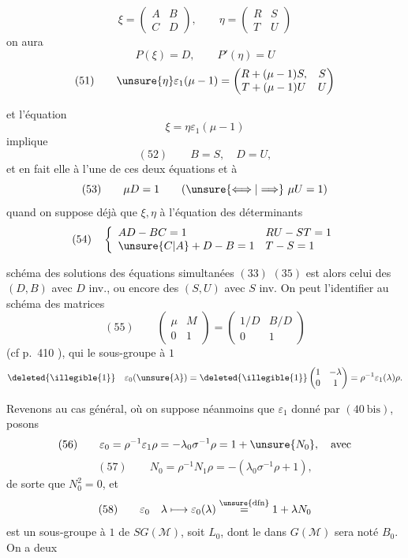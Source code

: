 \[
\xi=\begin{pmatrix}A&B\\C&D\end{pmatrix},\qquad
\eta=\begin{pmatrix}R&S\\T&U\end{pmatrix}
\]
on aura
\[
P(\xi)=D,\qquad P'(\eta)=U
\]
\[
(51)\qquad
\unsure{\eta}\varepsilon_1(\mu-1)
=\begin{pmatrix}
R+(\mu-1)S,&S\\
T+(\mu-1)U&U
\end{pmatrix}
\]


et l'équation
\[
\xi=\eta\varepsilon_1(\mu-1)
\]
 implique
\[
(52)\qquad B=S,\quad D=U,
\]
et en fait elle  à l'une de ces deux équations et à
\[
(53)\qquad \mu D=1\qquad (\unsure{\Longleftrightarrow|\Longrightarrow}\ \mu U=1)
\]
quand on suppose déjà que $\xi,\eta$  à l'équation des  déterminants 
\[
(54)\quad
\left\{\begin{array}{ll}
AD-BC=1 & RU-ST=1\\
\unsure{C|A}+D-B=1 & T-S=1
\end{array}\right.
\]

  schéma des solutions des équations simultanées $(33)$  $(35)$ est alors celui des $(D,B)$ avec $D$ inv., ou encore des $(S,U)$ avec $S$ inv. On peut l'identifier au schéma des matrices
\[
(55)\qquad
\begin{pmatrix}\mu&M\\0&1\end{pmatrix}
=\begin{pmatrix}1/D&B/D\\0&1\end{pmatrix}
\]
(cf p.~410 ), qui  le sous-groupe à $1$ 
\[
\deleted{\illegible{1}}\quad
\varepsilon_0(\unsure{\lambda})=\deleted{\illegible{1}}
\begin{pmatrix}1&-\lambda\\0&1\end{pmatrix}
=\rho^{-1}\varepsilon_1(\lambda)\rho.
\]



Revenons au cas général, où on suppose néanmoins que $\varepsilon_1$ donné par $(40\ \mathrm{bis})$,  posons
\[
(56)\qquad \varepsilon_0=\rho^{-1}\varepsilon_1\rho
=-\lambda_0\sigma^{-1}\rho=1+\unsure{N_0},\quad\text{avec}
\]
\[
(57)\qquad N_0=\rho^{-1}N_1\rho=-(\lambda_0\sigma^{-1}\rho+1),
\]
de sorte que $N_0^2=0$, et
\[
(58)\qquad \varepsilon_0\quad\lambda\longmapsto
\varepsilon_0(\lambda)\overset{\unsure{\mathrm{dfn}}}{=}1+\lambda N_0
\]
est un sous-groupe à $1$  de $SG(\mathcal M)$, soit $L_0$, dont le  dans $G(\mathcal M)$ sera noté $B_0$. On a deux 

